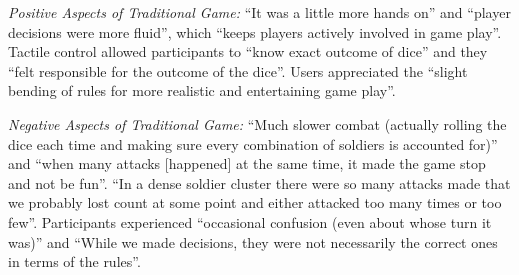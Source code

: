 \documentclass[10pt,twocolumn,letterpaper]{article}
\begin{document}

{\em Positive Aspects of Traditional Game:} %
%
%
%
``It was a little more hands on'' and
``player decisions were more fluid'', which
``keeps players actively involved in game play''.
%
Tactile control allowed participants to ``know exact outcome of dice''
and they ``felt responsible for the outcome of the
dice''.
%
Users appreciated the
``slight bending of rules for more realistic and entertaining game play''.




{\em Negative Aspects of Traditional Game:} %
%
%
%
``Much slower combat (actually rolling the dice each time and making sure every combination of soldiers is accounted for)''
and
``when many attacks [happened] at the same time, it made the game stop and not be fun''.
%
``In a dense soldier cluster there were so many attacks made that we probably lost count at some point and either attacked too many times or too few''.
Participants experienced ``occasional confusion (even about whose turn it was)''
%
and ``While we made decisions, they were not necessarily the
correct ones in terms of the rules''.
\end{document}
